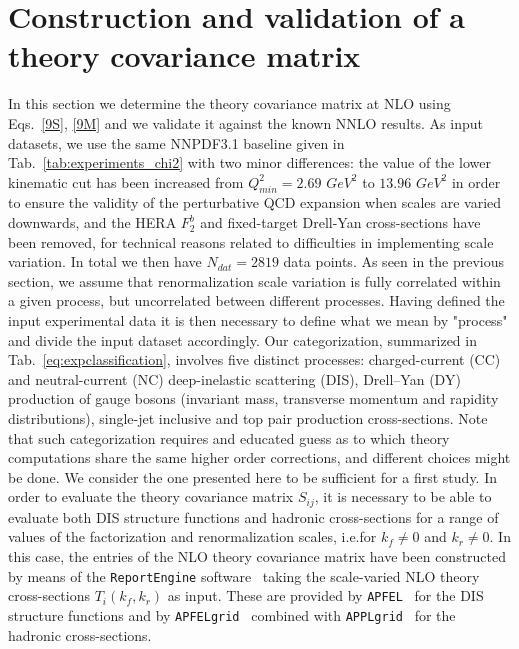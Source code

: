     \section{Construction and validation of a theory covariance matrix}
    In this section we determine the theory covariance matrix at NLO using Eqs.~\ref{9S}, \ref{9M}
    and we validate it against the known NNLO results.
    As input datasets, we use the same NNPDF3.1 baseline given in Tab.~\ref{tab:experiments_chi2} with two minor differences:
    the value of the lower kinematic cut has been increased from $Q^2_{min} = 2.69 \,\,GeV^2$ to $13.96 \,\, GeV^2$
    in order to ensure the validity of the perturbative QCD expansion when scales are varied downwards, 
    and the HERA $F^b_2$ and fixed-target Drell-Yan cross-sections have been removed, 
    for technical reasons related to difficulties in implementing scale variation. 
    In total we then have $N_{dat} = 2819$ data points.
    As seen in the previous section, we assume that renormalization scale variation is fully correlated within 
    a given process, but uncorrelated between different processes.
    Having defined the input experimental data it is then necessary to define what we mean by "process" and
    divide the input dataset accordingly.
    Our categorization, summarized in Tab.~\ref{eq:expclassification}, involves five distinct processes:  charged-current (CC)
    and neutral-current (NC) deep-inelastic scattering (DIS),
    Drell–Yan (DY) production of gauge bosons (invariant mass,
    transverse momentum and rapidity distributions), single-jet
    inclusive and top pair production cross-sections.
    Note that such categorization requires and educated guess as to which theory computations share the same higher order
    corrections, and different choices might be done. 
    We consider the one presented here to be sufficient for a first study. 
    In order to evaluate the theory covariance matrix $S_{ij}$, it is necessary
    to be able to evaluate both DIS structure functions and hadronic
    cross-sections for a range of values of the factorization
    and renormalization scales, i.e.for $k_f \neq  0$ and $k_r \neq 0$.
    In this case, the entries of the NLO theory covariance matrix have been 
    constructed
    by means of the {\tt ReportEngine} software~\cite{zahari_kassabov_2019_2571601}
    taking the
    scale-varied NLO theory cross-sections $T_i(k_f,k_r)$  as input.
    These are provided 
    by {\tt APFEL}~\cite{Bertone:2013vaa} for the DIS structure functions
    and by {\tt APFELgrid}~\cite{Bertone:2016lga} combined with
    {\tt APPLgrid}~\cite{Carli:2010rw} for the hadronic
    cross-sections.

